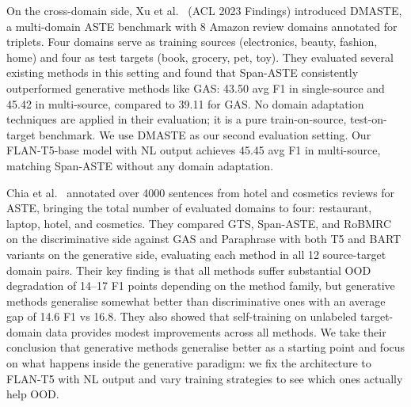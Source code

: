 \documentclass[12pt,a4paper]{report}
\begin{document}
On the cross-domain side, Xu et al.~\cite{xu2023dmaste} (ACL 2023 Findings) introduced DMASTE, a multi-domain ASTE benchmark with 8 Amazon review domains annotated for triplets. Four domains serve as training sources (electronics, beauty, fashion, home) and four as test targets (book, grocery, pet, toy). They evaluated several existing methods in this setting and found that Span-ASTE consistently outperformed generative methods like GAS: 43.50 avg F1 in single-source and 45.42 in multi-source, compared to 39.11 for GAS. No domain adaptation techniques are applied in their evaluation; it is a pure train-on-source, test-on-target benchmark. We use DMASTE as our second evaluation setting. Our FLAN-T5-base model with NL output achieves 45.45 avg F1 in multi-source, matching Span-ASTE without any domain adaptation.

Chia et al.~\cite{chia2022rethinking} annotated over 4000 sentences from hotel and cosmetics reviews for 
ASTE, bringing the total number of evaluated domains to four: restaurant, laptop, hotel, and cosmetics. 
They compared GTS, Span-ASTE, and RoBMRC on the discriminative side against GAS and Paraphrase with both 
T5 and BART variants on the generative side, evaluating each method in all 12 source-target domain pairs. 
Their key finding is that all methods suffer substantial OOD degradation of 14--17 F1 points depending on 
the method family, but generative methods generalise somewhat better than discriminative ones with an 
average gap of 14.6 F1 vs 16.8. They also showed that self-training on unlabeled target-domain data 
provides modest improvements across all methods. We take their conclusion that generative methods 
generalise better as a starting point and focus on what happens inside the generative paradigm: we fix 
the architecture to FLAN-T5 with NL output and vary training strategies to see which ones actually help OOD.
\end{document}
